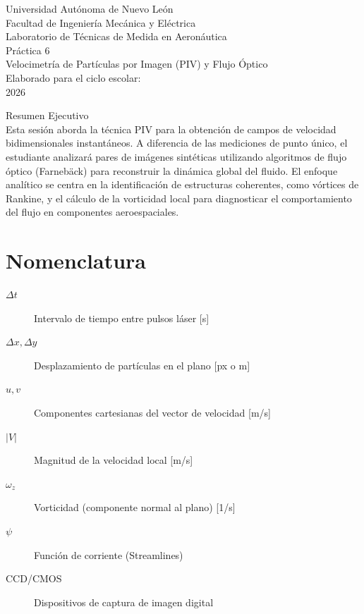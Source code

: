 \documentclass[11pt, a4paper]{article}
\begin{document}
\begin{titlepage}
    \centering
    {\LARGE Universidad Autónoma de Nuevo León}\\[0.5cm]
    {\Large Facultad de Ingeniería Mecánica y Eléctrica}\\[2cm]
    
    {\Large Laboratorio de Técnicas de Medida en Aeronáutica}\\[1cm]
    
    {\Huge Práctica 6}\\[0.5cm]
    {\Large Velocimetría de Partículas por Imagen (PIV) y Flujo Óptico}\\[2cm]
    
    Elaborado para el ciclo escolar:\\
    2026\\[2cm]
    
    \vfill
    
    Resumen Ejecutivo\\
    Esta sesión aborda la técnica PIV para la obtención de campos de velocidad bidimensionales instantáneos. A diferencia de las mediciones de punto único, el estudiante analizará pares de imágenes sintéticas utilizando algoritmos de flujo óptico (Farnebäck) para reconstruir la dinámica global del fluido. El enfoque analítico se centra en la identificación de estructuras coherentes, como vórtices de Rankine, y el cálculo de la vorticidad local para diagnosticar el comportamiento del flujo en componentes aeroespaciales.
\end{titlepage}

\tableofcontents
\newpage

\section*{Nomenclatura}
\begin{description}
    \item[$\Delta t$] Intervalo de tiempo entre pulsos láser [s]
    \item[$\Delta x, \Delta y$] Desplazamiento de partículas en el plano [px o m]
    \item[$u, v$] Componentes cartesianas del vector de velocidad [m/s]
    \item[$|V|$] Magnitud de la velocidad local [m/s]
    \item[$\omega_z$] Vorticidad (componente normal al plano) [1/s]
    \item[$\psi$] Función de corriente (Streamlines)
    \item[CCD/CMOS] Dispositivos de captura de imagen digital
\end{description}
\end{document}
